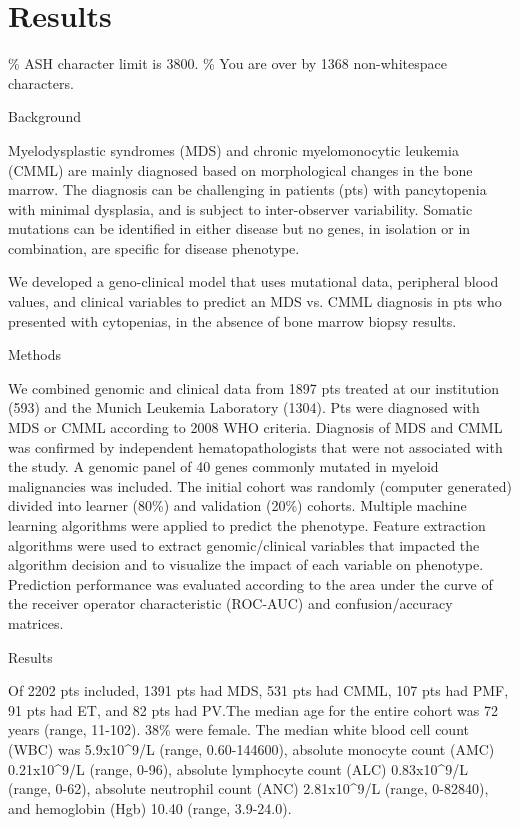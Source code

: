 \section{Results}%
\% ASH character limit is 3800. 
\% You are over by 1368 non-whitespace characters.


Background

Myelodysplastic syndromes (MDS) and chronic myelomonocytic leukemia (CMML) are mainly diagnosed based on morphological changes in the bone marrow. The diagnosis can be challenging in patients (pts) with pancytopenia with minimal dysplasia, and is subject to inter-observer variability. Somatic mutations can be identified in either disease but no genes, in isolation or in combination, are specific for disease phenotype.

We developed a geno-clinical model that uses mutational data, peripheral blood values, and clinical variables to predict an MDS vs. CMML diagnosis in pts who presented with cytopenias, in the absence of bone marrow biopsy results.


Methods

We combined genomic and clinical data from 1897 pts treated at our institution (593) and the Munich Leukemia Laboratory (1304). Pts were diagnosed with MDS or CMML according to 2008 WHO criteria. Diagnosis of MDS and CMML was confirmed by independent hematopathologists that were not associated with the study. A genomic panel of 40 genes commonly mutated in myeloid malignancies was included. The initial cohort was randomly (computer generated) divided into learner (80\%) and validation (20\%) cohorts. Multiple machine learning algorithms were applied to predict the phenotype. Feature extraction algorithms were used to extract genomic/clinical variables that impacted the algorithm decision and to visualize the impact of each variable on phenotype. Prediction performance was evaluated according to the area under the curve of the receiver operator characteristic (ROC-AUC) and confusion/accuracy matrices.


Results

Of 2202 pts included, 1391 pts had MDS, 531 pts had CMML, 107 pts had PMF, 91 pts had ET, and 82 pts had PV.The median age for the entire cohort was 72 years (range, 11-102). 38\% were female. The median white blood cell count (WBC) was 5.9x10^9/L (range, 0.60-144600), absolute monocyte count (AMC) 0.21x10^9/L (range, 0-96), absolute lymphocyte count (ALC) 0.83x10^9/L (range, 0-62), absolute neutrophil count (ANC) 2.81x10^9/L (range, 0-82840), and hemoglobin (Hgb)  10.40 (range, 3.9-24.0). 

